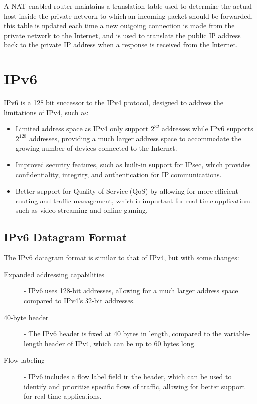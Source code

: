 \documentclass[12pt letter]{report}
\begin{document}
A NAT-enabled router maintains a translation table used to determine
the actual host inside the private network to which an incoming
packet should be forwarded, this table is updated each time a new
outgoing connection is made from the private network to the Internet,
and is used to translate the public IP address back to the private IP
address when a response is received from the Internet.

\section{IPv6}

IPv6 is a 128 bit successor to the IPv4 protocol, designed to address
the limitations of IPv4, such as:
\begin{itemize}
  \item Limited address space as IPv4 only support $2^{32}$ addresses
    while IPv6 supports $2^{128}$ addresses, providing a much larger
    address space to accommodate the growing number of devices
    connected to the Internet.
  \item Improved security features, such as built-in support for IPsec, which
    provides confidentiality, integrity, and authentication for IP
    communications.
  \item  Better support for Quality of Service (QoS) by allowing for
    more efficient routing and traffic management, which is important
    for real-time
    applications such as video streaming and online gaming.
\end{itemize}

\subsection{IPv6 Datagram Format}

The IPv6 datagram format is similar to that of IPv4, but with some changes:

\begin{description}
  \item[Expanded addressing capabilities]  - IPv6 uses 128-bit
    addresses, allowing for a much larger address space compared to
    IPv4's 32-bit addresses.
  \item[40-byte header] - The IPv6 header is fixed at 40 bytes in
    length, compared to the variable-length header of IPv4, which can
    be up to 60 bytes long.
  \item[Flow labeling] - IPv6 includes a flow label field in the
    header, which can be used to identify and prioritize specific
    flows of traffic, allowing for better support for real-time applications.
\end{description}
\end{document}
